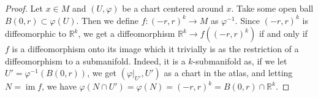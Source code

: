 \documentclass[reqno]{amsart}
\theoremstyle{definition}
\theoremstyle{remark}
\DeclareMathOperator{\im}{im}
\begin{document}
\begin{proof}
    Let $x \in M$ and $\left( U, \varphi  \right) $ be
    a chart centered around $x$. Take some
    open ball $B\left( 0,r \right) \subset 
    \varphi (U)$. Then we define
    $f \colon \left( -r,r \right)^{k} 
    \to M$ as $\varphi^{-1}$. Since
    $\left( -r,r \right)^{k} $ is diffeomorphic to
    $\mathbb{R}^{k}$, we get a diffeomorphism
    $\mathbb{R}^{k} \to f\left( (-r,r)^{k} \right) $ if and
    only if $f$ is a diffeomorphism onto its image which
    it trivially is as the restriction of a diffeomorphism
    to a submanifold. Indeed, it is a $k$-submanifold
    as, if we let 
    $U' = \varphi^{-1} \left( B(0,r) \right) $, we
    get $\left( \varphi|_{U'}, U' \right) $ as a chart in
    the atlas, and letting
     $N = \im f$, we have
     $\varphi \left( N \cap U' \right) 
     = \varphi (N) = \left( -r,r \right)^{k}
     = B\left( 0,r \right) \cap \mathbb{R}^{k}$.
\end{proof}



\end{document}

